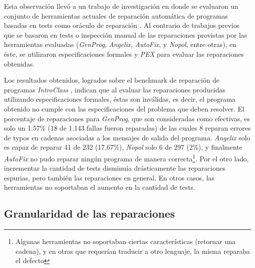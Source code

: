 Esta observaci\'on llev\'o a un trabajo de investigaci\'on en donde se evaluaron un conjunto de herramientas actuales de reparaci\'on autom\'atica de programas basadas en tests como or\'aculo de reparaci\'on \cite{bibliography.repair.ZeminBGCDRAF17}. Al contrario de trabajos previos que se basaron en tests o inspecci\'on manual de las reparaciones provistas por las herramientas evaluadas (\emph{GenProg}, \emph{Angelix}, \emph{AutoFix}, y \emph{Nopol}, entre otras), en \'este, se utilizaron especificaciones formales y \emph{PEX} \cite{bibliography.formalver.TillmannH08} para evaluar las reparaciones obtenidas.

Los resultados obtenidos, logrados sobre el benchmark de reparaci\'on de programas \emph{IntroClass} \cite{bibliography.repair.benchmarks.GouesHSBDFW15}, indican que al evaluar las reparaciones producidas utilizando especificaciones formales, \'estas son inv\'alidas, es decir, el programa obtenido no cumple con las especificaciones del problema que deben resolver. El porcentaje de reparaciones para \emph{GenProg}, que son consideradas como efectivas, es solo un 1.57\% (18 de 1.143 fallas fueron reparadas) de las cuales 8 reparan errores de typos en cadenas asociadas a los mensajes de salida del programa. \emph{Angelix} solo es capaz de reparar 41 de 232 (17,67\%), \emph{Nopol} solo 6 de 297 (2\%), y finalmente \emph{AutoFix} no pudo reparar ning\'un programa de manera correcta\footnote{Algunas herramientas no soportaban ciertas caracter\'isticas (retornar una cadena), y en otras que requer\'ian traducir a otro lenguaje, la misma reparaba el defecto}. Por el otro lado, incrementar la cantidad de tests disminu\'ia dr\'asticamente las reparaciones espurias, pero tambi\'en las reparaciones en general. En otros casos, las herramientas no soportaban el aumento en la cantidad de tests.

\subsection{Granularidad de las reparaciones}
\label{sec:repair.granularity}

